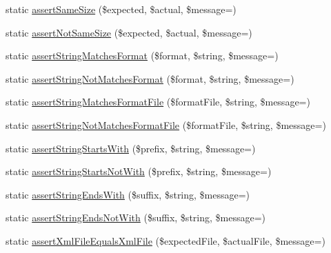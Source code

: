 \begin{DoxyCompactItemize}
static \mbox{\hyperlink{class_p_h_p_unit___framework___assert_a7d4f429754062c2a5dd9594387b9abb1}{assert\+Same\+Size}} (\$expected, \$actual, \$message=\textquotesingle{}\textquotesingle{})
\item 
static \mbox{\hyperlink{class_p_h_p_unit___framework___assert_ac34e020efec2a435c12a72c019aaed0f}{assert\+Not\+Same\+Size}} (\$expected, \$actual, \$message=\textquotesingle{}\textquotesingle{})
\item 
static \mbox{\hyperlink{class_p_h_p_unit___framework___assert_a584800813055460ff1bc51dbbadbeeee}{assert\+String\+Matches\+Format}} (\$format, \$string, \$message=\textquotesingle{}\textquotesingle{})
\item 
static \mbox{\hyperlink{class_p_h_p_unit___framework___assert_ab3de5f97737cc34fc2ff6efb1a46378e}{assert\+String\+Not\+Matches\+Format}} (\$format, \$string, \$message=\textquotesingle{}\textquotesingle{})
\item 
static \mbox{\hyperlink{class_p_h_p_unit___framework___assert_afb68fcfac2e71b5e3e5484cc03c69be3}{assert\+String\+Matches\+Format\+File}} (\$format\+File, \$string, \$message=\textquotesingle{}\textquotesingle{})
\item 
static \mbox{\hyperlink{class_p_h_p_unit___framework___assert_a311674aafcbc54fb91c7d8b7b4e39c52}{assert\+String\+Not\+Matches\+Format\+File}} (\$format\+File, \$string, \$message=\textquotesingle{}\textquotesingle{})
\item 
static \mbox{\hyperlink{class_p_h_p_unit___framework___assert_aeb9aeab26bf501776b879a438400f11e}{assert\+String\+Starts\+With}} (\$prefix, \$string, \$message=\textquotesingle{}\textquotesingle{})
\item 
static \mbox{\hyperlink{class_p_h_p_unit___framework___assert_a702979afb40552ec739719b68e5c5225}{assert\+String\+Starts\+Not\+With}} (\$prefix, \$string, \$message=\textquotesingle{}\textquotesingle{})
\item 
static \mbox{\hyperlink{class_p_h_p_unit___framework___assert_a2000b7782754a10214376df93a5822f2}{assert\+String\+Ends\+With}} (\$suffix, \$string, \$message=\textquotesingle{}\textquotesingle{})
\item 
static \mbox{\hyperlink{class_p_h_p_unit___framework___assert_af46721b0a106d12b53a9fe4c3d5b40c4}{assert\+String\+Ends\+Not\+With}} (\$suffix, \$string, \$message=\textquotesingle{}\textquotesingle{})
\item 
static \mbox{\hyperlink{class_p_h_p_unit___framework___assert_a2290dabdf302d534ed193ae1034370a2}{assert\+Xml\+File\+Equals\+Xml\+File}} (\$expected\+File, \$actual\+File, \$message=\textquotesingle{}\textquotesingle{})

\end{DoxyCompactItemize}
